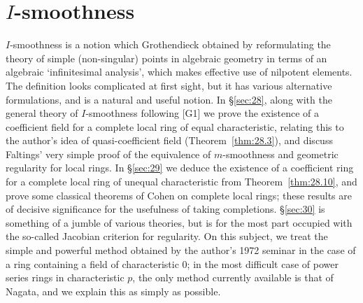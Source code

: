 \chapter{$I$-smoothness}\label{ch:10}

$I$-smoothness is a notion which Grothendieck obtained by reformulating the
theory of simple (non-singular) points in algebraic geometry in terms of an
algebraic `infinitesimal analysis', which makes effective use of nilpotent
elements. The definition looks complicated at first sight, but it has various
alternative formulations, and is a natural and useful notion. In \S\ref{sec:28},
along with the general theory of $I$-smoothness following [G1] we prove the
existence of a coefficient field for a complete local ring of equal
characteristic, relating this to the author's idea of quasi-coefficient field
(Theorem~\ref{thm:28.3}), and discuss Faltings' very simple proof of the
equivalence of $m$-smoothness and geometric regularity for local rings. In
\S\ref{sec:29} we deduce the existence of a coefficient ring for a complete local ring
of unequal characteristic from Theorem~\ref{thm:28.10}, and prove some classical
theorems of Cohen on complete local rings; these results are of decisive
significance for the usefulness of taking completions. \S\ref{sec:30} is something of a
jumble of various theories, but is for the most part occupied with the
so-called Jacobian criterion for regularity. On this subject, we treat the
simple and powerful method obtained by the author's 1972 seminar in the case
of a ring containing a field of characteristic $0$; in the most difficult case of
power series rings in characteristic $p$, the only method currently available
is that of Nagata, and we explain this as simply as possible.




